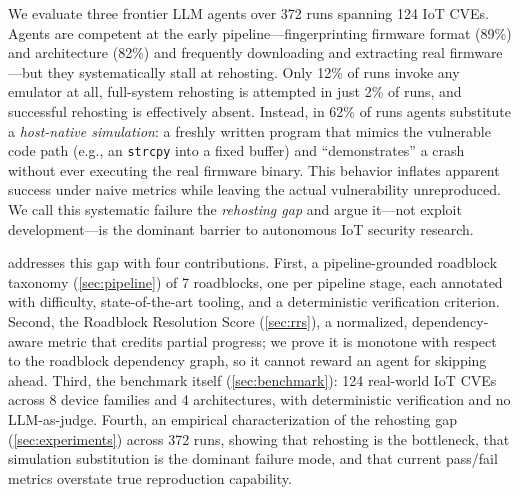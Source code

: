 We evaluate three frontier LLM agents over 372 runs spanning 124 IoT CVEs. Agents are competent at the early pipeline---fingerprinting firmware format (89\%) and architecture (82\%) and frequently downloading and extracting real firmware---but they systematically stall at rehosting. Only 12\% of runs invoke any emulator at all, full-system rehosting is attempted in just 2\% of runs, and successful rehosting is effectively absent. Instead, in 62\% of runs agents substitute a \emph{host-native simulation}: a freshly written program that mimics the vulnerable code path (e.g., an \texttt{strcpy} into a fixed buffer) and ``demonstrates'' a crash without ever executing the real firmware binary. This behavior inflates apparent success under naive metrics while leaving the actual vulnerability unreproduced. We call this systematic failure the \emph{rehosting gap} and argue it---not exploit development---is the dominant barrier to autonomous IoT security research.

\sys addresses this gap with four contributions. First, a pipeline-grounded roadblock taxonomy (\cref{sec:pipeline}) of 7 roadblocks, one per pipeline stage, each annotated with difficulty, state-of-the-art tooling, and a deterministic verification criterion. Second, the Roadblock Resolution Score (\cref{sec:rrs}), a normalized, dependency-aware metric that credits partial progress; we prove it is monotone with respect to the roadblock dependency graph, so it cannot reward an agent for skipping ahead. Third, the benchmark itself (\cref{sec:benchmark}): 124 real-world IoT CVEs across 8 device families and 4 architectures, with deterministic verification and no LLM-as-judge. Fourth, an empirical characterization of the rehosting gap (\cref{sec:experiments}) across 372 runs, showing that rehosting is the bottleneck, that simulation substitution is the dominant failure mode, and that current pass/fail metrics overstate true reproduction capability.

